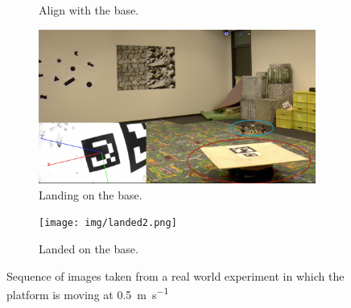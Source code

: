 \begin{figure}[!htbp]
\begin{subfigure}[b]{0.5\textwidth}
        \caption{Align with the base.}
        \label{fig:three}
   \end{subfigure}
    \begin{subfigure}[b]{0.5\textwidth}
        \includegraphics[width=\textwidth]{img/landing2.png}
        \caption{Landing on the base.}
        \label{fig:four}
   \end{subfigure} 
    \begin{subfigure}[b]{0.5\textwidth}
        \texttt{[image: img/landed2.png]}
        \caption{Landed on the base.}
        \label{fig:five}
   \end{subfigure}
   
  \caption{Sequence of images taken from a real world experiment in which the platform is moving at \SI{0.5}{\meter \per \second} }
  \label{fig:landing2}
\end{figure} 


